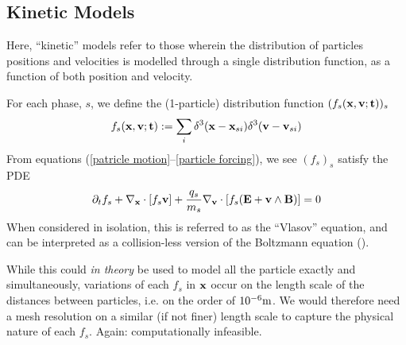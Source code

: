 \subsection*{Kinetic Models}
    \begin{definition}
        Here, ``kinetic'' models refer to those wherein the distribution of particles positions and velocities is modelled through a single distribution function, as a function of both position and velocity.
    \end{definition}
    For each phase, $s$, we define the (1-particle) distribution function $(f_{s}(\mathbf{x}, \mathbf{v}; \mathbf{t}))_{s}$
    \begin{equation}
        f_{s}(\mathbf{x}, \mathbf{v}; \mathbf{t})  :=  \sum_{i}\delta^{3}(\mathbf{x} - \mathbf{x}_{si})\delta^{3}(\mathbf{v} - \mathbf{v}_{si})
    \end{equation}
    From equations (\ref{patricle motion}–\ref{particle forcing}), we see $(f_{s})_{s}$ satisfy the PDE
    \begin{equation}
        \partial_{t}f_{s} + \nabla_{\mathbf{x}}\cdot[f_{s}\mathbf{v}] + \frac{q_{s}}{m_{s}}\nabla_{\mathbf{v}}\cdot[f_{s}(\mathbf{E} + \mathbf{v}\wedge\mathbf{B})]  =  0
    \end{equation}
    When considered in isolation, this is referred to as the ``Vlasov'' equation, and can be interpreted as a collision-less version of the Boltzmann equation ().
    
    While this could \emph{in theory} be used to model all the particle exactly and simultaneously, variations of each $f_{s}$ in $\mathbf{x}$ occur on the length scale of the distances between particles, i.e. on the order of $10^{- 6}\mathrm{m}$. We would therefore need a mesh resolution on a similar (if not finer) length scale to capture the physical nature of each $f_{s}$. Again: computationally infeasible.
    